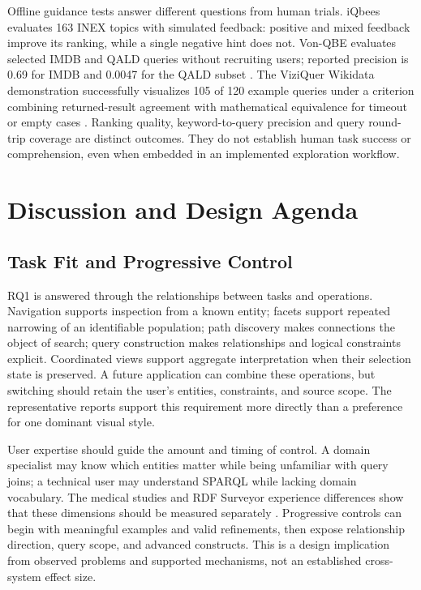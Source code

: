 \documentclass[manuscript,review,screen]{acmart}
\begin{document}
Offline guidance tests answer different questions from human trials. iQbees evaluates 163 INEX topics with simulated feedback: positive and mixed feedback improve its ranking, while a single negative hint does not. Von-QBE evaluates selected IMDB and QALD queries without recruiting users; reported precision is 0.69 for IMDB and 0.0047 for the QALD subset \citep{V3-01566,V3-02018}. The ViziQuer Wikidata demonstration successfully visualizes 105 of 120 example queries under a criterion combining returned-result agreement with mathematical equivalence for timeout or empty cases \citep{V3-02757}. Ranking quality, keyword-to-query precision and query round-trip coverage are distinct outcomes. They do not establish human task success or comprehension, even when embedded in an implemented exploration workflow.

\section{Discussion and Design Agenda}
\subsection{Task Fit and Progressive Control}
RQ1 is answered through the relationships between tasks and operations. Navigation supports inspection from a known entity; facets support repeated narrowing of an identifiable population; path discovery makes connections the object of search; query construction makes relationships and logical constraints explicit. Coordinated views support aggregate interpretation when their selection state is preserved. A future application can combine these operations, but switching should retain the user's entities, constraints, and source scope. The representative reports support this requirement more directly than a preference for one dominant visual style.

User expertise should guide the amount and timing of control. A domain specialist may know which entities matter while being unfamiliar with query joins; a technical user may understand SPARQL while lacking domain vocabulary. The medical studies and RDF Surveyor experience differences show that these dimensions should be measured separately \citep{2021_Witschel_Natural_Language-based,2022_Grether_Studying_Interaction,V3-01765}. Progressive controls can begin with meaningful examples and valid refinements, then expose relationship direction, query scope, and advanced constructs. This is a design implication from observed problems and supported mechanisms, not an established cross-system effect size.
\end{document}
